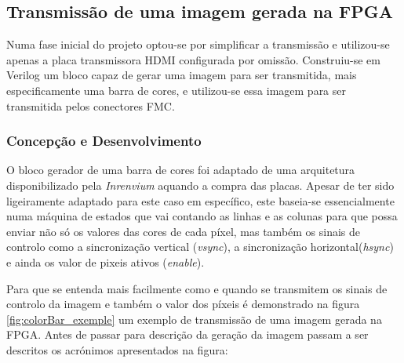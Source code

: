 \subsection{Transmissão de uma imagem gerada na FPGA} \label{subsub:planA}

Numa fase inicial do projeto optou-se por simplificar a transmissão e utilizou-se apenas a placa transmissora HDMI configurada por omissão. Construiu-se em Verilog um bloco capaz de gerar uma imagem para ser transmitida, mais especificamente uma barra de cores, e utilizou-se essa imagem para ser transmitida pelos conectores FMC.

\subsubsection*{Concepção e Desenvolvimento}

O bloco gerador de uma barra de cores foi adaptado de uma arquitetura disponibilizado pela \textit{Inrenvium} aquando a compra das placas. Apesar de ter sido ligeiramente adaptado para este caso em específico, este baseia-se essencialmente numa máquina de estados que vai contando as linhas e as colunas para que possa enviar não só os valores das cores de cada píxel, mas também os sinais de controlo como a sincronização vertical (\textit{vsync}), a sincronização horizontal(\textit{hsync}) e ainda os valor de pixeis ativos (\textit{enable}).

Para que se entenda mais facilmente como e quando se transmitem os sinais de controlo da imagem e também o valor dos píxeis é demonstrado na figura \ref{fig:colorBar_exemple} um exemplo de transmissão de uma imagem gerada na FPGA. Antes de passar para descrição da geração da imagem passam a ser descritos os acrónimos apresentados na figura:

